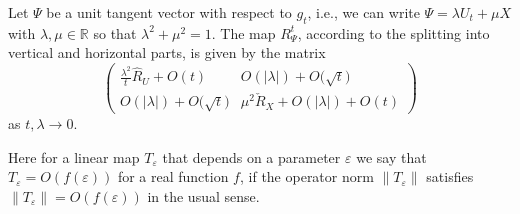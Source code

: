 \begin{Corollary}\label{R_matrix}
	Let $\Psi$ be a unit tangent vector with respect to $g_t$, i.e., we can write $\Psi=\lambda U_t+\mu X$ with $\lambda,\mu\in\mathbb{R}$ so that $\lambda^2+\mu^2=1$. The map $R_\Psi^t$, according to the splitting into vertical and horizontal parts, is given by the matrix
	\begin{equation*}
	\begin{pmatrix}
		\frac{\lambda^2}{t}\hat{R}_U+O(t) & O(|\lambda|)+O\bigl(\sqrt{t}\bigr)\\
		O(|\lambda|)+O\bigl(\sqrt{t}\bigr) & \mu^2 \check{R}_X+O(|\lambda|)+O(t)
	\end{pmatrix}
\end{equation*}
	as $t,\lambda\to0$.
\end{Corollary}
Here for a linear map $T_\varepsilon$ that depends on a parameter $\varepsilon$ we say that $T_\varepsilon=O(f(\varepsilon))$ for a real function $f$, if the operator norm $\lVert T_\varepsilon\rVert$ satisfies $\lVert T_\varepsilon\rVert=O(f(\varepsilon))$ in the usual sense.
